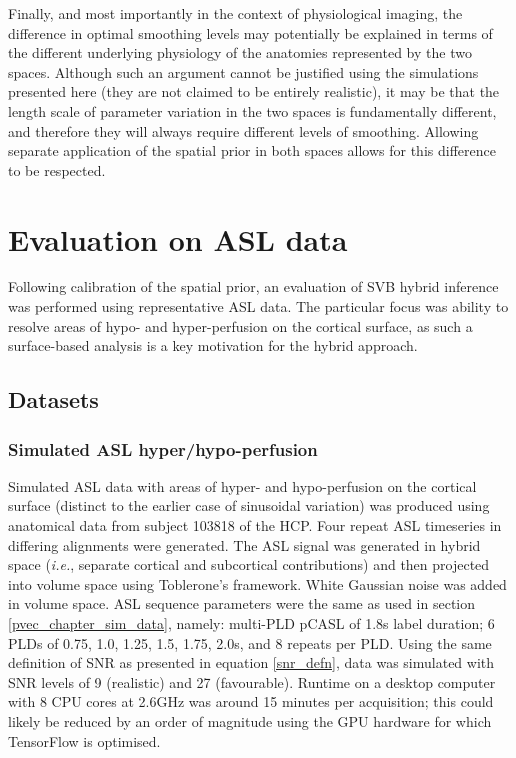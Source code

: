 \documentclass[12pt]{report}
\begin{document}
Finally, and most importantly in the context of physiological imaging, the difference in optimal smoothing levels may potentially be explained in terms of the different underlying physiology of the anatomies represented by the two spaces. Although such an argument cannot be justified using the simulations presented here (they are not claimed to be entirely realistic), it may be that the length scale of parameter variation in the two spaces is fundamentally different, and therefore they will always require different levels of smoothing. Allowing separate application of the spatial prior in both spaces allows for this difference to be respected. 

\section{Evaluation on ASL data}

Following calibration of the spatial prior, an evaluation of SVB hybrid inference was performed using representative ASL data. The particular focus was ability to resolve areas of hypo- and hyper-perfusion on the cortical surface, as such a surface-based analysis is a key motivation for the hybrid approach. 

\subsection{Datasets}

\subsubsection{Simulated ASL hyper/hypo-perfusion}

Simulated ASL data with areas of hyper- and hypo-perfusion on the cortical surface (distinct to the earlier case of sinusoidal variation) was produced using anatomical data from subject 103818 of the HCP. Four repeat ASL timeseries in differing alignments were generated. The ASL signal was generated in hybrid space (\textit{i.e.}, separate cortical and subcortical contributions) and then projected into volume space using Toblerone's framework. White Gaussian noise was added in volume space. ASL sequence parameters were the same as used in section \ref{pvec_chapter_sim_data}, namely: multi-PLD pCASL of 1.8s label duration; 6 PLDs of 0.75, 1.0, 1.25, 1.5, 1.75, 2.0s, and 8 repeats per PLD. Using the same definition of SNR as presented in equation \ref{snr_defn}, data was simulated with SNR levels of 9 (realistic) and 27 (favourable). Runtime on a desktop computer with 8 CPU cores at 2.6GHz was around 15 minutes per acquisition; this could likely be reduced by an order of magnitude using the GPU hardware for which TensorFlow is optimised. 
\end{document}
